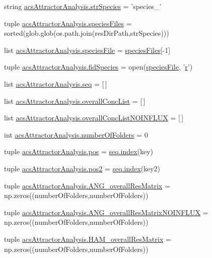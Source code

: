 \begin{DoxyCompactItemize}
\item 
string \hyperlink{a00124_aa76707ba3058ba96fc8e5aeafa461193}{acs\+Attractor\+Analysis.\+str\+Species} = 'species\+\_\+'
\item 
tuple \hyperlink{a00124_a670249d163388a9d93c8f3b9fb63afac}{acs\+Attractor\+Analysis.\+species\+Files} = sorted(glob.\+glob(os.\+path.\+join(res\+Dir\+Path,str\+Species)))
\item 
list \hyperlink{a00124_a0e036b776f4f724254115c2e284657eb}{acs\+Attractor\+Analysis.\+species\+File} = \hyperlink{a00028_af5703745c2c2a6af7f62da460994d9c2}{species\+Files}\mbox{[}-\/1\mbox{]}
\item 
tuple \hyperlink{a00124_a604c9f75892d8d8aeac8306c94630a23}{acs\+Attractor\+Analysis.\+fid\+Species} = open(\hyperlink{a00027_a7da0c82834970c5f3c3d9224ab832577}{species\+File}, '\hyperlink{a00031_ac862e7284527eb913b1351c8bfb8e079}{r}')
\item 
list \hyperlink{a00124_a33bc0e3fc99bab3df33d3f1626a19528}{acs\+Attractor\+Analysis.\+seq} = \mbox{[}$\,$\mbox{]}
\item 
list \hyperlink{a00124_aca1d14f4dbff06c02b0e3e362c7ffe14}{acs\+Attractor\+Analysis.\+overall\+Conc\+List} = \mbox{[}$\,$\mbox{]}
\item 
list \hyperlink{a00124_a62444c9b0d66deb07c2e1091695e7561}{acs\+Attractor\+Analysis.\+overall\+Conc\+List\+N\+O\+I\+N\+F\+L\+U\+X} = \mbox{[}$\,$\mbox{]}
\item 
int \hyperlink{a00124_aa5d2495d08b8ad5ebf34f85d5417e93c}{acs\+Attractor\+Analysis.\+number\+Of\+Folders} = 0
\item 
tuple \hyperlink{a00124_abae060beb170fe923fc10b75f9e82079}{acs\+Attractor\+Analysis.\+pos} = \hyperlink{a00102_a0cd6a44ffb07342cbc7e5ac33bfc9495}{seq.\+index}(key)
\item 
tuple \hyperlink{a00124_a6ab79d8205f5d0ae2da47fb0af93149a}{acs\+Attractor\+Analysis.\+pos2} = \hyperlink{a00102_a0cd6a44ffb07342cbc7e5ac33bfc9495}{seq.\+index}(key2)
\item 
tuple \hyperlink{a00124_a43a783e7bdb1094aa477c438bd67259f}{acs\+Attractor\+Analysis.\+A\+N\+G\+\_\+overall\+Res\+Matrix} = np.\+zeros((number\+Of\+Folders,number\+Of\+Folders))
\item 
tuple \hyperlink{a00124_a0d0e0ed8583e4aa041fa6c122324311e}{acs\+Attractor\+Analysis.\+A\+N\+G\+\_\+overall\+Res\+Matrix\+N\+O\+I\+N\+F\+L\+U\+X} = np.\+zeros((number\+Of\+Folders,number\+Of\+Folders))
\item 
tuple \hyperlink{a00124_a46dc8cdfb545b64952370e51ff02336f}{acs\+Attractor\+Analysis.\+H\+A\+M\+\_\+overall\+Res\+Matrix} = np.\+zeros((number\+Of\+Folders,number\+Of\+Folders))

\end{DoxyCompactItemize}
